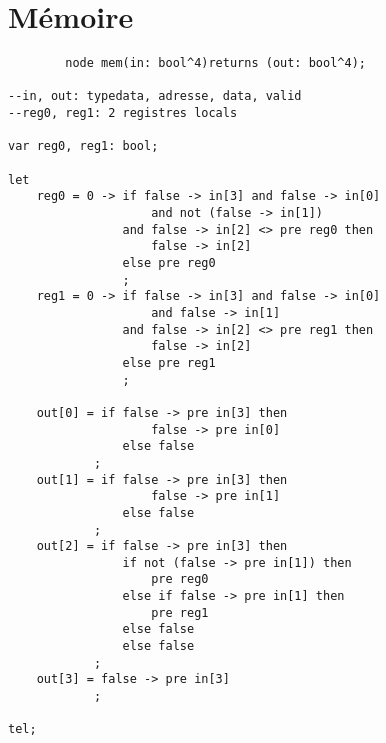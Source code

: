 \documentclass[a4paper,11pt]{report}
\begin{document}
\chapter{Mémoire}
	\begin{framed}
		\begin{verbatim}
		node mem(in: bool^4)returns (out: bool^4);

--in, out: typedata, adresse, data, valid
--reg0, reg1: 2 registres locals

var reg0, reg1: bool;

let
    reg0 = 0 -> if false -> in[3] and false -> in[0] 
    				and not (false -> in[1])
                and false -> in[2] <> pre reg0 then
                    false -> in[2]
                else pre reg0
                ;
    reg1 = 0 -> if false -> in[3] and false -> in[0] 
    				and false -> in[1]
                and false -> in[2] <> pre reg1 then
                    false -> in[2]
                else pre reg1
                ;

    out[0] = if false -> pre in[3] then
                    false -> pre in[0]
                else false
            ;
    out[1] = if false -> pre in[3] then
                    false -> pre in[1]
                else false
            ;
    out[2] = if false -> pre in[3] then
                if not (false -> pre in[1]) then
                    pre reg0
                else if false -> pre in[1] then
                    pre reg1
                else false
                else false
            ;
    out[3] = false -> pre in[3]
            ;

tel;

		\end{verbatim}
	\end{framed}
\end{document}
